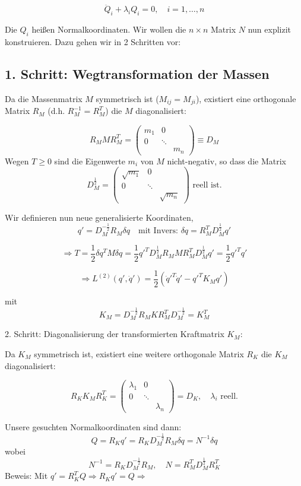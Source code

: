 \documentclass[10pt, letterpaper]{article}
\begin{document}
\[\ddot{Q}_i + \lambda_i Q_i = 0, \quad i=1,\ldots,n\]

Die $Q_i$ heißen Normalkoordinaten. Wir wollen die $n\times n$ Matrix $N$ nun explizit konstruieren. Dazu gehen wir in 2 Schritten vor:

\subsection*{1. Schritt: Wegtransformation der Massen}

Da die Massenmatrix $M$ symmetrisch ist ($M_{ij}=M_{ji}$), existiert eine orthogonale Matrix $R_M$ (d.h. $R_M^{-1}=R_M^T$) die $M$ diagonalisiert:

\[R_M M R_M^T = \begin{pmatrix}m_1 & 0 & \\ 0 & \ddots & \\ & & m_n\end{pmatrix} \equiv D_M\]
Wegen $T\geq 0$ sind die Eigenwerte $m_i$ von $M$ nicht-negativ, so dass die Matrix
\[D_M^{\frac{1}{2}}=\begin{pmatrix}\sqrt{m_1} & 0 & \\ 0 & \ddots & \\ & & \sqrt{m_n}\end{pmatrix}\text{ reell ist.}\]

Wir definieren nun neue generalisierte Koordinaten,
\[q'=D_M^{-\frac{1}{2}}R_M\delta q \quad \text{mit Invers: }\delta q=R_M^T D_M^{\frac{1}{2}}q'\]

\[\Rightarrow T=\frac{1}{2}\delta q^T M\delta q=\frac{1}{2}q'^T D_M^{\frac{1}{2}}R_M MR_M^T D_M^{\frac{1}{2}}q'=\frac{1}{2}q'^T q'\]

\[\Rightarrow L^{(2)}(q',\dot{q}')=\frac{1}{2}(\dot{q}'^T\dot{q}'-q'^T K_M q')\]

mit \[K_M=D_M^{-\frac{1}{2}}R_M K R_M^T D_M^{-\frac{1}{2}}=K_M^T\]



2. Schritt: Diagonalisierung der transformierten Kraftmatrix $K_M$:

Da $K_M$ symmetrisch ist, existiert eine weitere orthogonale Matrix $R_K$ die $K_M$ diagonalisiert:

\[R_K K_M R_K^T=\begin{pmatrix}\lambda_1 & 0 & \\ 0 & \ddots & \\ & & \lambda_n\end{pmatrix}=D_K, \quad \lambda_i \text{ reell.}\]

Unsere gesuchten Normalkoordinaten sind dann:
\[Q=R_K q'=R_K D_M^{-\frac{1}{2}}R_M\delta q=N^{-1}\delta q\]
wobei \[N^{-1}=R_K D_M^{-\frac{1}{2}}R_M, \quad N=R_M^T D_M^{\frac{1}{2}}R_K^T\]
Beweis: Mit $q'=R_K^T Q \Rightarrow R_K q'=Q \Rightarrow$
\end{document}

